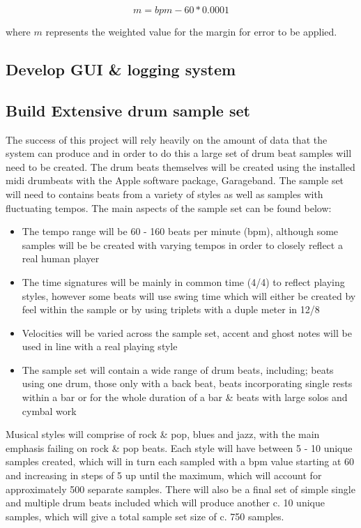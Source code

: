 \documentclass[a4paper, 11pt]{article}
\begin{document}
\[ m = bpm - 60 * 0.0001\]

where \(m\) represents the weighted value for the margin for error to be applied.

\subsection{Develop GUI \& logging system}


\subsection{Build Extensive drum sample set}
The success of this project will rely heavily on the amount of data that the system can produce and in order to do this a large set of drum beat samples will need to be created. The drum beats themselves will be created using the installed midi drumbeats with the Apple software package, Garageband. The sample set will need to contains beats from a variety of styles as well as samples with fluctuating tempos. The main aspects of the sample set can be found below:

\begin{itemize}
\item The tempo range will be 60 - 160 beats per minute (bpm), although some samples will be be created with varying tempos in order to closely reflect a real human player
\item The time signatures will be mainly in common time (4/4) to reflect playing styles, however some beats will use swing time which will either be created by feel within the sample or by using triplets with a duple meter in 12/8
\item Velocities will be varied across the sample set, accent and ghost notes will be used in line with a real playing style
\item The sample set will contain a wide range of drum beats, including; beats using one drum, those only with a back beat, beats incorporating single rests within a bar or for the whole duration of a bar \& beats with large solos and cymbal work
\end{itemize} 

Musical styles will comprise of rock \& pop, blues and jazz, with the main emphasis failing on rock \& pop beats. Each style will have between 5 - 10 unique samples created, which will in turn each sampled with a bpm value starting at 60 and increasing in steps of 5 up until the maximum, which will account for approximately 500 separate samples. There will also be a final set of simple single and multiple drum beats included which will produce another c. 10 unique samples, which will give a total sample set size of c. 750 samples.
\clearpage
\maketitle{} 
\end{document}
